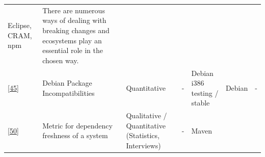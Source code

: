 \documentclass[]{book}
\begin{document}
\begin{longtable}[]{@{}lllllll@{}}
\begin{minipage}[t]{0.12\columnwidth}
Eclipse, CRAM, npm\strut
\end{minipage} & \begin{minipage}[t]{0.10\columnwidth}\raggedright\strut
There are numerous ways of dealing with breaking changes and ecosystems
play an essential role in the chosen way.\strut
\end{minipage}\tabularnewline
\begin{minipage}[t]{0.09\columnwidth}\raggedright\strut
{[}\protect\hyperlink{ref-Claes2015}{45}{]}\strut
\end{minipage} & \begin{minipage}[t]{0.16\columnwidth}\raggedright\strut
Debian Package Incompatibilities\strut
\end{minipage} & \begin{minipage}[t]{0.17\columnwidth}\raggedright\strut
Quantitative\strut
\end{minipage} & \begin{minipage}[t]{0.07\columnwidth}\raggedright\strut
-\strut
\end{minipage} & \begin{minipage}[t]{0.10\columnwidth}\raggedright\strut
Debian i386 testing / stable\strut
\end{minipage} & \begin{minipage}[t]{0.12\columnwidth}\raggedright\strut
Debian\strut
\end{minipage} & \begin{minipage}[t]{0.10\columnwidth}\raggedright\strut
-\strut
\end{minipage}\tabularnewline
\begin{minipage}[t]{0.09\columnwidth}\raggedright\strut
{[}\protect\hyperlink{ref-Cox2015}{50}{]}\strut
\end{minipage} & \begin{minipage}[t]{0.16\columnwidth}\raggedright\strut
Metric for dependency freshness of a system\strut
\end{minipage} & \begin{minipage}[t]{0.17\columnwidth}\raggedright\strut
Qualitative / Quantitative (Statistics, Interviews)\strut
\end{minipage} & \begin{minipage}[t]{0.07\columnwidth}\raggedright\strut
-\strut
\end{minipage} & \begin{minipage}[t]{0.10\columnwidth}\raggedright\strut
Maven\strut
\end{minipage} & \begin{minipage}[t]{0.12\columnwidth}\raggedright\strut

\end{minipage}
\end{longtable}
\end{document}
